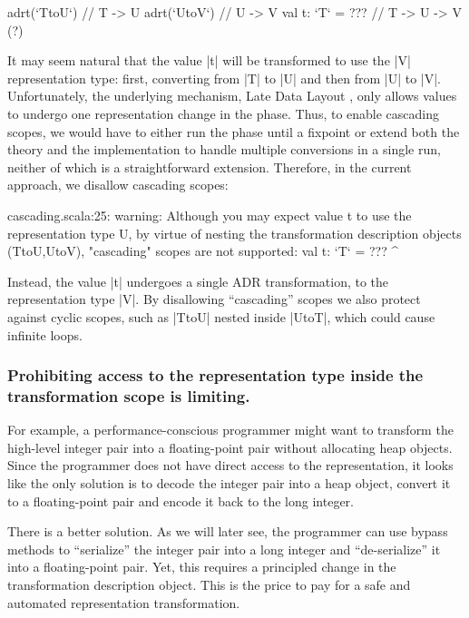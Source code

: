 \begin{lstlisting-nobreak}
adrt(`TtoU`) {             // T -> U
  adrt(`UtoV`) {           // U -> V
    val t: `T` = ???       // T -> U -> V (?)
  }
}
\end{lstlisting-nobreak}

It may seem natural that the value |t| will be transformed to use the |V| representation type: first, converting from |T| to |U| and then from |U| to |V|. Unfortunately, the underlying mechanism, Late Data Layout \cite{ldl}, only allows values to undergo one representation change in the \coerce{} phase. Thus, to enable cascading scopes, we would have to either run the \coerce{} phase until a fixpoint or extend both the theory and the implementation to handle multiple conversions in a single run, neither of which is a straightforward extension.
Therefore, in the current approach, we disallow cascading scopes:

\begin{lstlisting-nobreak}
cascading.scala:25:  warning: Although you may expect value t to use the representation type U, by virtue of nesting the transformation description objects (TtoU,UtoV), "cascading" scopes are not supported:
val t: `T` = ???
         ^
\end{lstlisting-nobreak}

Instead, the value |t| undergoes a single ADR transformation, to the representation type |V|. By disallowing ``cascading'' scopes we also protect against cyclic scopes, such as |TtoU| nested inside |UtoT|, which could cause infinite loops.


\subsubsection*{Prohibiting access to the representation type inside the transformation scope is limiting.} For example, a per\-for\-mance-conscious programmer might want to transform the high-level integer pair into a floating-point pair without allocating heap objects. Since the programmer does not have direct access to the representation, it looks like the only solution is to decode the integer pair into a heap object, convert it to a floating-point pair and encode it back to the long integer.

There is a better solution. As we will later see, the programmer can use bypass methods to ``serialize'' the integer pair into a long integer and ``de-serialize'' it into a floating-point pair. Yet, this requires a principled change in the transformation description object. This is the price to pay for a safe and automated representation transformation.

